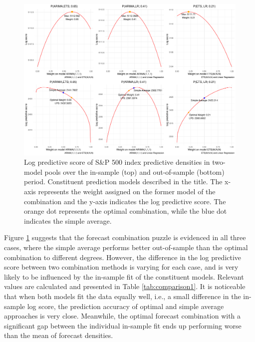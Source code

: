 \documentclass{monashthesis}
\begin{document}
\begin{figure}[ht]
\centering
\includegraphics[scale=0.45]{figures/SP500_nonstationary.pdf}
\caption{Log predictive score of S\&P 500 index predictive densities in two-model pools over the in-sample (top) and out-of-sample (bottom) period. Constituent prediction models described in the title. The x-axis represents the weight assigned on the former model of the combination and the y-axis indicates the log predictive score. The orange dot represents the optimal combination, while the blue dot indicates the simple average.}
\label{fig:nonstat}
\end{figure}

Figure \ref{fig:nonstat} suggests that the forecast combination puzzle is evidenced in all three cases, where the simple average performs better out-of-sample than the optimal combination to different degrees. However, the difference in the log predictive score between two combination methods is varying for each case, and is very likely to be influenced by the in-sample fit of the constituent models. Relevant values are calculated and presented in Table \ref{tab:comparison1}. It is noticeable that when both models fit the data equally well, i.e., a small difference in the in-sample log score, the prediction accuracy of optimal and simple average approaches is very close. Meanwhile, the optimal forecast combination with a significant gap between the individual in-sample fit ends up performing worse than the mean of forecast densities.
\end{document}
